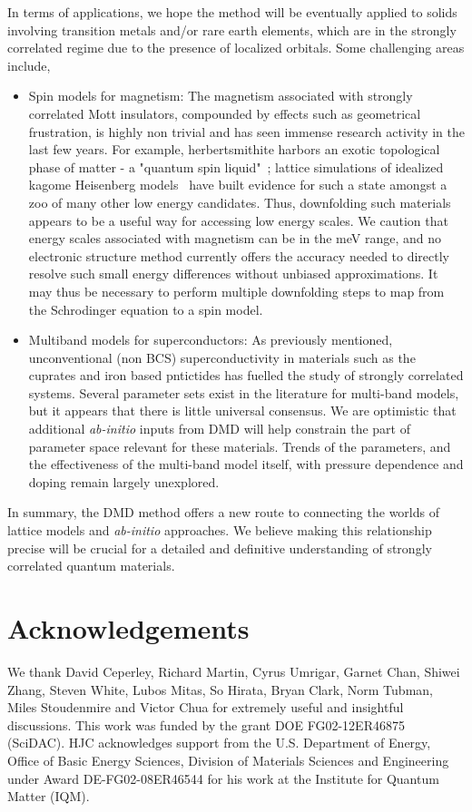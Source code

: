 In terms of applications, we hope the method will be eventually applied to solids involving transition 
metals and/or rare earth elements, which are in the strongly correlated regime due to the presence of localized orbitals. 
Some challenging areas include,
\begin{itemize} 
	\item Spin models for magnetism: 
	The magnetism associated with strongly correlated Mott insulators, compounded by effects such as geometrical frustration, 
	is highly non trivial and has seen immense research activity in the last few years. 
	For example, herbertsmithite harbors an exotic topological phase of matter - a "quantum spin liquid"~\cite{NormanRMP}; 
	lattice simulations of idealized kagome Heisenberg models~\cite{Yan_Huse_White, Changlani_kagome} have built evidence 
	for such a state amongst a zoo of many other low energy candidates. Thus, 
	downfolding such materials~\cite{Jeschke2013} appears to be a useful way for accessing low energy scales. 
	We caution that energy scales associated with magnetism can be in the meV range, and no electronic structure 
	method currently offers the accuracy needed to directly resolve such small energy differences without unbiased approximations. 
	It may thus be necessary to perform multiple downfolding steps to map from the Schrodinger equation to a spin model.
	\item Multiband models for superconductors:
	As previously mentioned, unconventional (non BCS) superconductivity in materials such as the cuprates and iron based 
	pntictides has fuelled the study of strongly correlated systems.
	Several parameter sets exist in the literature for multi-band models, but it appears that there is little universal consensus. 
	We are optimistic that additional \textit{ab-initio} inputs from DMD will help constrain the part of parameter 
	space relevant for these materials. Trends of the parameters, and the effectiveness of the multi-band model itself, 
	with pressure dependence and doping remain largely unexplored.  
\end{itemize} 
In summary, the DMD method offers a new route to connecting the worlds of lattice models and \textit{ab-initio} approaches. 
We believe making this relationship precise will be crucial for a detailed and definitive 
understanding of strongly correlated quantum materials. 

\section{Acknowledgements} 
We thank  David Ceperley,  Richard Martin, Cyrus Umrigar,  Garnet Chan,  Shiwei Zhang, Steven White,  
Lubos Mitas, So Hirata, Bryan Clark, Norm Tubman, Miles Stoudenmire and Victor Chua for extremely useful and insightful discussions. 
This work was funded by the grant DOE FG02-12ER46875 (SciDAC). HJC acknowledges support from the U.S. Department of Energy, 
Office of Basic Energy Sciences, Division of Materials Sciences and Engineering under Award DE-FG02-08ER46544 for his work at the Institute for Quantum Matter (IQM). 

